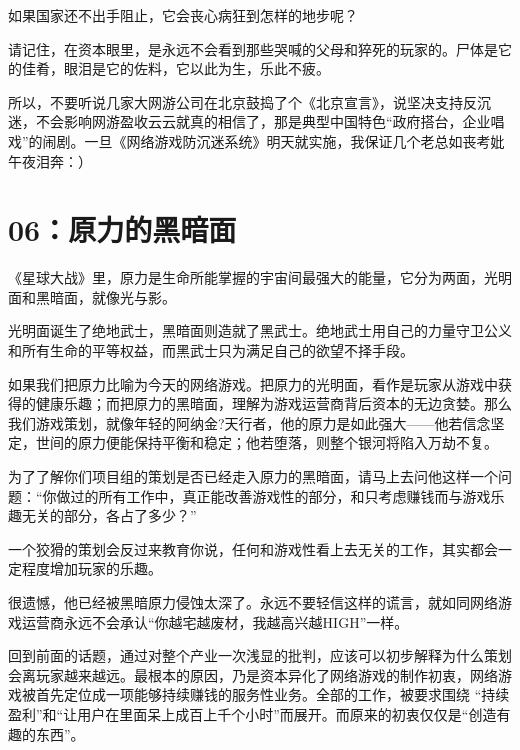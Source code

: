\documentclass{article}
\begin{document}
如果国家还不出手阻止，它会丧心病狂到怎样的地步呢？



请记住，在资本眼里，是永远不会看到那些哭喊的父母和猝死的玩家的。尸体是它的佳肴，眼泪是它的佐料，它以此为生，乐此不疲。



所以，不要听说几家大网游公司在北京鼓捣了个《北京宣言》，说坚决支持反沉迷，不会影响网游盈收云云就真的相信了，那是典型中国特色“政府搭台，企业唱戏”的闹剧。一旦《网络游戏防沉迷系统》明天就实施，我保证几个老总如丧考妣午夜泪奔：）





{\centering\section*{06：原力的黑暗面}}





《星球大战》里，原力是生命所能掌握的宇宙间最强大的能量，它分为两面，光明面和黑暗面，就像光与影。



光明面诞生了绝地武士，黑暗面则造就了黑武士。绝地武士用自己的力量守卫公义和所有生命的平等权益，而黑武士只为满足自己的欲望不择手段。



如果我们把原力比喻为今天的网络游戏。把原力的光明面，看作是玩家从游戏中获得的健康乐趣；而把原力的黑暗面，理解为游戏运营商背后资本的无边贪婪。那么我们游戏策划，就像年轻的阿纳金?天行者，他的原力是如此强大——他若信念坚定，世间的原力便能保持平衡和稳定；他若堕落，则整个银河将陷入万劫不复。



为了了解你们项目组的策划是否已经走入原力的黑暗面，请马上去问他这样一个问题：“你做过的所有工作中，真正能改善游戏性的部分，和只考虑赚钱而与游戏乐趣无关的部分，各占了多少？”



一个狡猾的策划会反过来教育你说，任何和游戏性看上去无关的工作，其实都会一定程度增加玩家的乐趣。



很遗憾，他已经被黑暗原力侵蚀太深了。永远不要轻信这样的谎言，就如同网络游戏运营商永远不会承认“你越宅越废材，我越高兴越HIGH”一样。



回到前面的话题，通过对整个产业一次浅显的批判，应该可以初步解释为什么策划会离玩家越来越远。最根本的原因，乃是资本异化了网络游戏的制作初衷，网络游戏被首先定位成一项能够持续赚钱的服务性业务。全部的工作，被要求围绕 “持续盈利”和“让用户在里面呆上成百上千个小时”而展开。而原来的初衷仅仅是“创造有趣的东西”。
\end{document}
